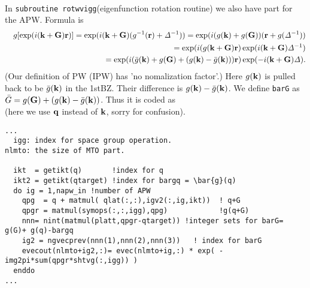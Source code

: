 \documentclass[a4paper,10pt,fleqn]{article}
\def\iDelta{{\it \Delta}}
\def\iDelta{{\it \Delta}}
\newcommand{\bfq}{{\bf q}}
\newcommand{\bfk}{{\bf k}}
\newcommand{\bfr}{{\bf r}}
\newcommand{\bfG}{{\bf G}}
\newcommand{\bfK}{{\bf K}}
\begin{document}
\noindent {}\\
In {\tt subroutine rotwvigg}(eigenfunction rotation routine) we also have part for the APW.
Formula is
\begin{eqnarray}
&&g[\exp(i (\bfk+\bfG)\bfr)]  
=\exp(i (\bfk+\bfG) (g^{-1}(\bfr)+\iDelta^{-1})) 
=\exp(i (g(\bfk)+g(\bfG)) (\bfr+g(\iDelta^{-1})) \nonumber \\
&&=\exp(i (g(\bfk+\bfG) \bfr) \exp(i (\bfk+\bfG) \iDelta^{-1}) \nonumber \\
&&= \exp({i (\bar{g}(\bfk) + g(\bfG)+ (g(\bfk)-\bar{g}(\bfk))) \bfr}) \exp({-i (\bfk+ \bfG)\iDelta}).
\end{eqnarray}
(Our definition of PW (IPW) has 'no nomalization factor'.)
Here $g(\bfk)$ is pulled back to be $\bar{g}(\bfk)$ in the 1stBZ. 
Their difference is $g(\bfk)-\bar{g}(\bfk)$. 
We define \verb#barG# as $\bar{G}=g(\bfG)+ (g(\bfk)-\bar{g}(\bfk))$.
Thus it is coded as \\
(here we use $\bfq$ instead of $\bfk$, sorry for confusion). 
\begin{verbatim}
...
  igg: index for space group operation.
nlmto: the size of MTO part.

  ikt  = getikt(q)       !index for q 
  ikt2 = getikt(qtarget) !index for bargq = \bar{g}(q) 
  do ig = 1,napw_in !number of APW 
    qpg  = q + matmul( qlat(:,:),igv2(:,ig,ikt))  ! q+G
    qpgr = matmul(symops(:,:,igg),qpg)            !g(q+G)
    nnn= nint(matmul(platt,qpgr-qtarget)) !integer sets for barG= g(G)+ g(q)-bargq
    ig2 = ngvecprev(nnn(1),nnn(2),nnn(3))   ! index for barG
    evecout(nlmto+ig2,:)= evec(nlmto+ig,:) * exp( -img2pi*sum(qpgr*shtvg(:,igg)) )
  enddo
...
\end{verbatim}
 


\end{document}
